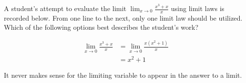 \documentclass{ximera}
\author{Steven Gubkin}
\begin{document}
\begin{exercise}

	A student's attempt to evaluate the limit $\lim_{x \to 0} \frac{x^3+x}{x}$ using limit laws is recorded below.  From one line to the next, only one limit law should be utilized.  Which of the following options best describes the student's work?
	
	\begin{align*}
		\lim_{x \to 0} \frac{x^3 + x}{x} &= \lim_{x \to 0} \frac{x(x^2+1)}{x}\\
		&= x^2+1
	\end{align*}
	
	\begin{multipleChoice}
	\end{multipleChoice}
	
	\begin{feedback}
		It never makes sense for the limiting variable to appear in the answer to a limit.
	\end{feedback}
	
\end{exercise}
\end{document}
